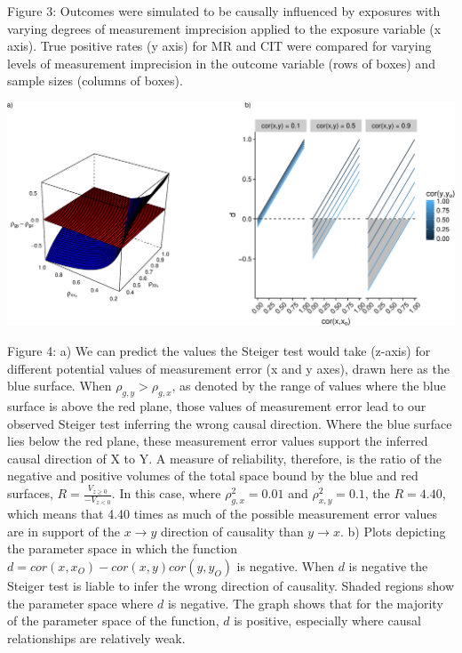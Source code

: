 \documentclass[]{article}
\begin{document}
Figure 3: Outcomes were simulated to be causally influenced by exposures
with varying degrees of measurement imprecision applied to the exposure
variable (x axis). True positive rates (y axis) for MR and CIT were
compared for varying levels of measurement imprecision in the outcome
variable (rows of boxes) and sample sizes (columns of boxes).

\newpage

\includegraphics{manuscript_files/figure-latex/steiger_sensitivity_plot-1.pdf}

Figure 4: a) We can predict the values the Steiger test would take
(z-axis) for different potential values of measurement error (x and y
axes), drawn here as the blue surface. When \(\rho_{g,y} > \rho_{g,x}\),
as denoted by the range of values where the blue surface is above the
red plane, those values of measurement error lead to our observed
Steiger test inferring the wrong causal direction. Where the blue
surface lies below the red plane, these measurement error values support
the inferred causal direction of X to Y. A measure of reliability,
therefore, is the ratio of the negative and positive volumes of the
total space bound by the blue and red surfaces,
\(R = \frac{V_{z \geq 0}}{ - V_{z < 0} }\). In this case, where
\(\rho_{g,x}^2 = 0.01\) and \(\rho_{x,y}^2 = 0.1\), the \(R = 4.40\),
which means that 4.40 times as much of the possible measurement error
values are in support of the \(x \rightarrow y\) direction of causality
than \(y \rightarrow x\). b) Plots depicting the parameter space in
which the function \(d = cor(x, x_O) - cor(x,y)cor(y, y_O)\) is
negative. When \(d\) is negative the Steiger test is liable to infer the
wrong direction of causality. Shaded regions show the parameter space
where \(d\) is negative. The graph shows that for the majority of the
parameter space of the function, \(d\) is positive, especially where
causal relationships are relatively weak.
\end{document}
